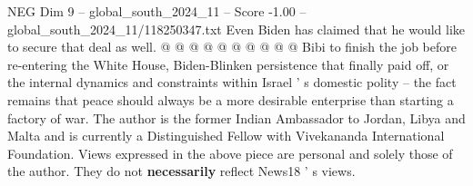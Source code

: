 \begin{textsample}{NEG Dim 9 – global\_south\_2024\_11 – Score -1.00 – global\_south\_2024\_11/118250347.txt}
Even Biden has claimed that he would like to secure that deal as well. @ @ @ @ @ @ @ @ @ @ Bibi to finish the job before re-entering the White House, Biden-Blinken persistence that finally paid off, or the internal dynamics and constraints within Israel ' s domestic polity -- the fact remains that peace should always be a more desirable enterprise than starting a factory of war.
The author is the former Indian Ambassador to Jordan, Libya and Malta and is currently a Distinguished Fellow with Vivekananda International Foundation.
Views expressed in the above piece are personal and solely those of the author.
They do not \textbf{necessarily} reflect News18 ' s views.

\end{textsample}
